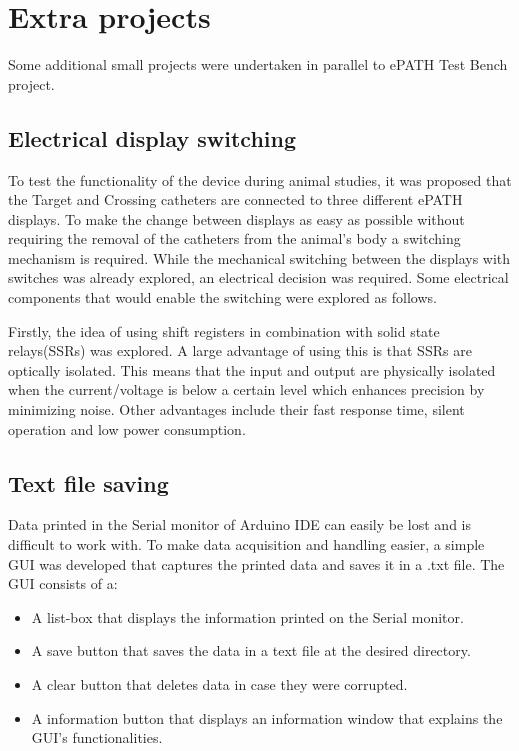 \section{Extra projects}

Some additional small projects were undertaken in parallel to ePATH Test Bench project.

\subsection{Electrical display switching}
To test the functionality of the device during animal studies, it was proposed that the Target and Crossing catheters are connected to three different ePATH displays. To make the change between displays as easy as possible without requiring the removal of the catheters from the animal's body a switching mechanism is required. While the mechanical switching between the displays with switches was already explored, an electrical decision was required. Some electrical components that would enable the switching were explored as follows.

Firstly, the idea of using shift registers in combination with solid state relays(SSRs) was explored. A large advantage of using this is that SSRs are optically isolated. This means that the input and output are physically isolated when the current/voltage is below a certain level which enhances precision by minimizing noise. Other advantages include their fast response time, silent operation and low power consumption. 



\subsection{Text file saving}
Data printed in the Serial monitor of Arduino IDE can easily be lost and is difficult to work with. To make data acquisition and handling easier, a simple GUI was developed that captures the printed data and saves it in a .txt file. The GUI consists of a:
\begin{itemize}
\item A list-box that displays the information printed on the Serial monitor. 
\item A save button that saves the data in a text file at the desired directory.
\item A clear button that deletes data in case they were corrupted.
\item A information button that displays an information window that explains the GUI's functionalities.
\end{itemize}

